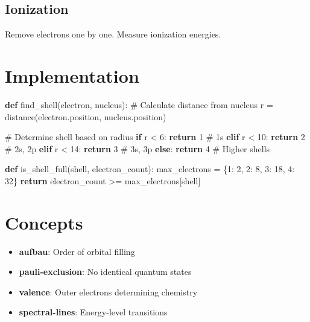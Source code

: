 \documentclass[
  11pt,
  letterpaper,
  twoside,
  openright]{book}
\newenvironment{Shaded}{\begin{snugshade}}{\end{snugshade}}
\newcommand{\CommentTok}[1]{\textcolor[rgb]{0.37,0.37,0.37}{#1}}
\newcommand{\ControlFlowTok}[1]{\textcolor[rgb]{0.00,0.23,0.31}{\textbf{#1}}}
\newcommand{\DecValTok}[1]{\textcolor[rgb]{0.68,0.00,0.00}{#1}}
\newcommand{\KeywordTok}[1]{\textcolor[rgb]{0.00,0.23,0.31}{\textbf{#1}}}
\newcommand{\NormalTok}[1]{\textcolor[rgb]{0.00,0.23,0.31}{#1}}
\newcommand{\OperatorTok}[1]{\textcolor[rgb]{0.37,0.37,0.37}{#1}}
\providecommand{\tightlist}{%
  \setlength{\itemsep}{0pt}\setlength{\parskip}{0pt}}
\begin{document}
\subsection{Ionization}\label{ionization-1}

Remove electrons one by one. Measure ionization energies.

\section{Implementation}\label{implementation}

\begin{Shaded}
\begin{Highlighting}[]
\KeywordTok{def}\NormalTok{ find\_shell(electron, nucleus):}
    \CommentTok{\# Calculate distance from nucleus}
\NormalTok{    r }\OperatorTok{=}\NormalTok{ distance(electron.position, nucleus.position)}

    \CommentTok{\# Determine shell based on radius}
    \ControlFlowTok{if}\NormalTok{ r }\OperatorTok{\textless{}} \DecValTok{6}\NormalTok{:}
        \ControlFlowTok{return} \DecValTok{1}  \CommentTok{\# 1s}
    \ControlFlowTok{elif}\NormalTok{ r }\OperatorTok{\textless{}} \DecValTok{10}\NormalTok{:}
        \ControlFlowTok{return} \DecValTok{2}  \CommentTok{\# 2s, 2p}
    \ControlFlowTok{elif}\NormalTok{ r }\OperatorTok{\textless{}} \DecValTok{14}\NormalTok{:}
        \ControlFlowTok{return} \DecValTok{3}  \CommentTok{\# 3s, 3p}
    \ControlFlowTok{else}\NormalTok{:}
        \ControlFlowTok{return} \DecValTok{4}  \CommentTok{\# Higher shells}

\KeywordTok{def}\NormalTok{ is\_shell\_full(shell, electron\_count):}
\NormalTok{    max\_electrons }\OperatorTok{=}\NormalTok{ \{}\DecValTok{1}\NormalTok{: }\DecValTok{2}\NormalTok{, }\DecValTok{2}\NormalTok{: }\DecValTok{8}\NormalTok{, }\DecValTok{3}\NormalTok{: }\DecValTok{18}\NormalTok{, }\DecValTok{4}\NormalTok{: }\DecValTok{32}\NormalTok{\}}
    \ControlFlowTok{return}\NormalTok{ electron\_count }\OperatorTok{\textgreater{}=}\NormalTok{ max\_electrons[shell]}
\end{Highlighting}
\end{Shaded}

\section{Concepts}\label{concepts-2}

\begin{itemize}
\tightlist
\item
  \textbf{aufbau}: Order of orbital filling
\item
  \textbf{pauli-exclusion}: No identical quantum states
\item
  \textbf{valence}: Outer electrons determining chemistry
\item
  \textbf{spectral-lines}: Energy-level transitions
\end{itemize}
\end{document}
